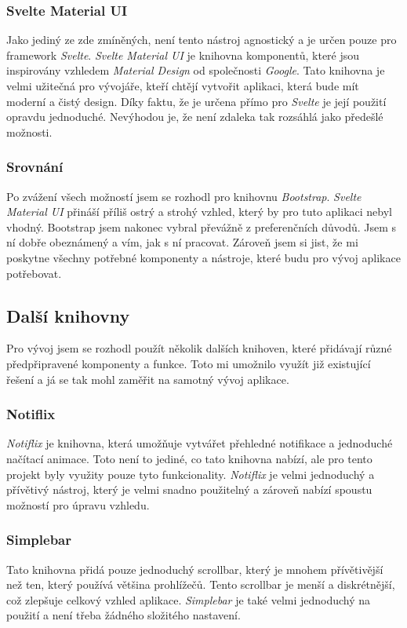 \subsubsection*{Svelte Material UI}
Jako jediný ze zde zmíněných, není tento nástroj agnostický a je určen pouze pro framework \textit{Svelte}. \textit{Svelte Material UI} je knihovna komponentů, které jsou inspirovány vzhledem \textit{Material Design} od společnosti \textit{Google}. Tato knihovna je velmi užitečná pro vývojáře, kteří chtějí vytvořit aplikaci, která bude mít moderní a čistý design. Díky faktu, že je určena přímo pro \textit{Svelte} je její použití opravdu jednoduché. Nevýhodou je, že není zdaleka tak rozsáhlá jako předešlé možnosti. \cite{svelte_material_ui}

\subsubsection*{Srovnání}
Po zvážení všech možností jsem se rozhodl pro knihovnu \textit{Bootstrap}. \textit{Svelte Material UI} přináší příliš ostrý a strohý vzhled, který by pro tuto aplikaci nebyl vhodný. Bootstrap jsem nakonec vybral převážně z preferenčních důvodů. Jsem s ní dobře obeznámený a vím, jak s ní pracovat. Zároveň jsem si jist, že mi poskytne všechny potřebné komponenty a nástroje, které budu pro vývoj aplikace potřebovat.

\subsection{Další knihovny}
Pro vývoj jsem se rozhodl použít několik dalších knihoven, které přidávají různé předpřipravené komponenty a funkce. Toto mi umožnilo využít již existující řešení a já se tak mohl zaměřit na samotný vývoj aplikace.

\subsubsection*{Notiflix}
\textit{Notiflix} je knihovna, která umožňuje vytvářet přehledné notifikace a jednoduché načítací animace. Toto není to jediné, co tato knihovna nabízí, ale pro tento projekt byly využity pouze tyto funkcionality. \textit{Notiflix} je velmi jednoduchý a přívětivý nástroj, který je velmi snadno použitelný a zároveň nabízí spoustu možností pro úpravu vzhledu. \cite{notiflix}

\subsubsection*{Simplebar}
Tato knihovna přidá pouze jednoduchý scrollbar, který je mnohem přívětivější než ten, který používá většina prohlížečů. Tento scrollbar je menší a diskrétnější, což zlepšuje celkový vzhled aplikace. \textit{Simplebar} je také velmi jednoduchý na použití a není třeba žádného složitého nastavení. \cite{simplebar}

